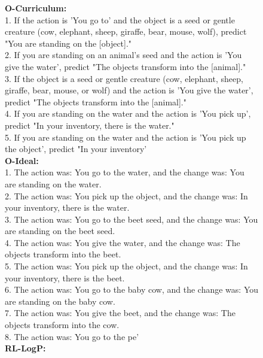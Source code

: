\documentclass{article}
\begin{document}
\begin{figure}[hbt]
\begin{promptbox}{}
    \footnotesize{
    \textbf{O-Curriculum: } \\
    1. If the action is 'You go to' and the object is a seed or gentle creature (cow, elephant, sheep, giraffe, bear, mouse, wolf), predict "You are standing on the [object]."\\2. If you are standing on an animal's seed and the action is 'You give the water', predict "The objects transform into the [animal]."\\3. If the object is a seed or gentle creature (cow, elephant, sheep, giraffe, bear, mouse, or wolf) and the action is 'You give the water', predict "The objects transform into the [animal]."\\4. If you are standing on the water and the action is 'You pick up', predict "In your inventory, there is the water."\\5. If you are standing on the water and the action is 'You pick up the object', predict "In your inventory'\\
    \textbf{O-Ideal: } \\
    1. The action was: You go to the water, and the change was: You are standing on the water.\\2. The action was: You pick up the object, and the change was: In your inventory, there is the water.\\3. The action was: You go to the beet seed, and the change was: You are standing on the beet seed.\\4. The action was: You give the water, and the change was: The objects transform into the beet.\\5. The action was: You pick up the object, and the change was: In your inventory, there is the beet.\\6. The action was: You go to the baby cow, and the change was: You are standing on the baby cow.\\7. The action was: You give the beet, and the change was: The objects transform into the cow.\\8. The action was: You go to the pe' \\
    \textbf{RL-LogP: } \\
}
\end{promptbox}
\end{figure}
\end{document}
